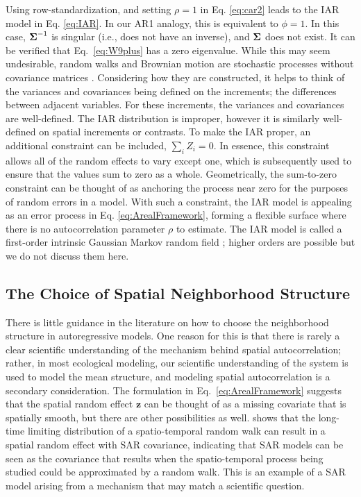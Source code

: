 \documentclass[11pt, titlepage]{article}\usepackage[]{graphicx}\usepackage[]{color}
\begin{document}
\begin{spacing}{1.9}
\begin{flushleft}
Using row-standardization, and setting $\rho = 1$ in Eq. \ref{eq:car2} leads to the IAR model in Eq. \ref{eq:IAR}.  In our AR1 analogy, this is equivalent to $\phi = 1$.  In this case, $\mbox{\boldmath $\Sigma$}^{-1}$ is singular (i.e., does not have an inverse), and $\mbox{\boldmath $\Sigma$}$ does not exist. It can be verified that Eq.~\ref{eq:W9plus} has a zero eigenvalue. While this may seem undesirable, random walks and Brownian motion are stochastic processes without covariance matrices \citep{Codl:Plan:Benh:rand:2008}.  Considering how they are constructed, it helps to think of the variances and covariances being defined on the increments; the differences between adjacent variables.  For these increments, the variances and covariances are well-defined. The IAR distribution is improper, however it is similarly well-defined on spatial increments or contrasts. To make the IAR proper, an additional constraint can be included, $\sum_i Z_i=0$. In essence, this constraint allows all of the random effects to vary except one, which is subsequently used to ensure that the values sum to zero as a whole. Geometrically, the sum-to-zero constraint can be thought of as anchoring the process near zero for the purposes of random errors in a model. With such a constraint, the IAR model is appealing as an error process in Eq. \ref{eq:ArealFramework}, forming a flexible surface where there is no autocorrelation parameter $\rho$ to estimate.  The IAR model is called a first-order intrinsic Gaussian Markov random field \cite[][p. 93]{Rue:Held:Gaus:2005}; higher orders are possible but we do not discuss them here. 


\subsection*{The Choice of Spatial Neighborhood Structure}

There is little guidance in the literature on how to choose the neighborhood structure in autoregressive models.  One reason for this is that there is rarely a clear scientific understanding of the mechanism behind spatial autocorrelation; rather, in most ecological modeling, our scientific understanding of the system is used to model the mean structure, and modeling spatial autocorrelation is a secondary consideration.  The formulation in Eq.~\ref{eq:ArealFramework} suggests that the spatial random effect $\mathbf{z}$ can be thought of as a missing covariate that is spatially smooth, but there are other possibilities as well. \citet{Hank:mode:2017} shows that the long-time limiting distribution of a spatio-temporal random walk can result in a spatial random effect with SAR covariance, indicating that SAR models can be seen as the covariance that results when the spatio-temporal process being studied could be approximated by a random walk. This is an example of a SAR model arising from a mechanism that may match a scientific question.  


\end{flushleft}
\end{spacing}
\end{document}
